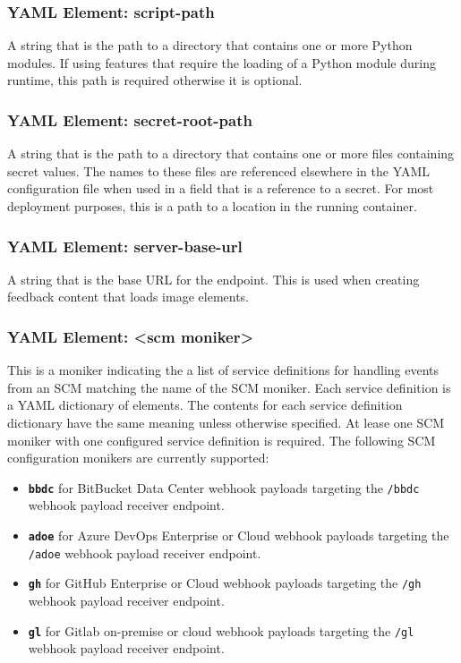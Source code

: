 \subsubsection{YAML Element: script-path}\label{sec:yaml-script-path}

A string that is the path to a directory that contains one or more Python modules.  If using features that
require the loading of a Python module during \cxoneflow runtime, this path is required otherwise it is
optional. 

\subsubsection{YAML Element: secret-root-path}\label{sec:yaml-secret-root-path}

A string that is the path to a directory that contains one or more files containing secret values.  The names to these files are 
referenced elsewhere in the YAML configuration file when used in a field that is a reference to a secret.  For most deployment
purposes, this is a path to a location in the \cxoneflow running container.

\subsubsection{YAML Element: server-base-url}\label{sec:yaml-server-base-url}
A string that is the base URL for the \cxoneflow endpoint.  This is used when creating feedback content that loads image elements.

\subsubsection{YAML Element: <scm moniker>}\label{sec:yaml-scm-monikers}

This is a moniker indicating the a list of service definitions for handling events from an SCM matching the name of the SCM
moniker.  Each service definition is a YAML dictionary of elements. The contents for each service definition dictionary 
have the same meaning unless otherwise specified.  At lease one SCM moniker with one configured service definition is required. 
The following SCM configuration monikers are currently supported:

\begin{itemize}
    \item \textbf{\texttt{bbdc}} for BitBucket Data Center webhook payloads targeting the \texttt{/bbdc}
    webhook payload receiver endpoint.
    \item \textbf{\texttt{adoe}} for Azure DevOps Enterprise or Cloud webhook payloads targeting the \texttt{/adoe}
    webhook payload receiver endpoint.
    \item \textbf{\texttt{gh}} for GitHub Enterprise or Cloud webhook payloads targeting the \texttt{/gh}
    webhook payload receiver endpoint.
    \item \textbf{\texttt{gl}} for Gitlab on-premise or cloud webhook payloads targeting the \texttt{/gl}
    webhook payload receiver endpoint.
\end{itemize}

